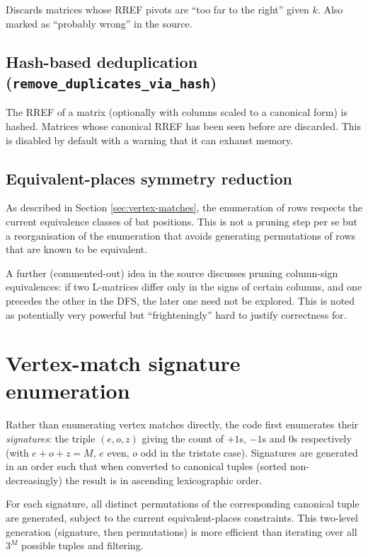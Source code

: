 \documentclass[12pt,a4paper]{article}
\begin{document}
Discards matrices whose RREF pivots are ``too far to the right'' given $k$.
Also marked as ``probably wrong'' in the source.

\subsection{Hash-based deduplication (\texttt{remove\_duplicates\_via\_hash})}

The RREF of a matrix (optionally with columns scaled to a canonical form) is
hashed. Matrices whose canonical RREF has been seen before are discarded. This
is disabled by default with a warning that it can exhaust memory.

\subsection{Equivalent-places symmetry reduction}

As described in Section \ref{sec:vertex-matches}, the enumeration of rows
respects the current equivalence classes of bat positions. This is not a
pruning step per se but a reorganisation of the enumeration that avoids
generating permutations of rows that are known to be equivalent.

A further (commented-out) idea in the source discusses pruning column-sign
equivalences: if two L-matrices differ only in the signs of certain columns,
and one precedes the other in the DFS, the later one need not be explored. This
is noted as potentially very powerful but ``frighteningly'' hard to justify
correctness for.

\section{Vertex-match signature enumeration}
\label{sec:signatures}

Rather than enumerating vertex matches directly, the code first enumerates
their \emph{signatures}: the triple $(e, o, z)$ giving the count of $+1$s,
$-1$s and $0$s respectively (with $e + o + z = M$, $e$ even, $o$ odd in
the tristate case). Signatures are generated in an order such that when
converted to canonical tuples (sorted non-decreasingly) the result is in
ascending lexicographic order.

For each signature, all distinct permutations of the corresponding canonical
tuple are generated, subject to the current equivalent-places constraints. This
two-level generation (signature, then permutations) is more efficient than
iterating over all $3^M$ possible tuples and filtering.
\end{document}
